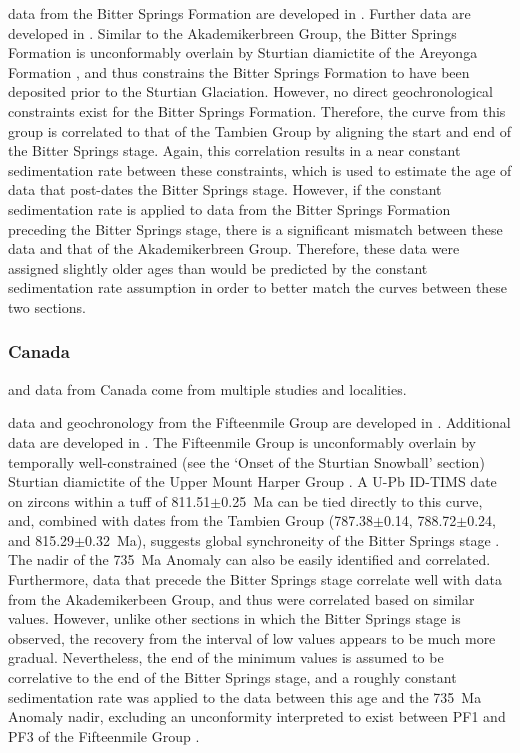 \dC data from the Bitter Springs Formation are developed in \citet{Swanson-Hysell2010a}. Further \SrSr data are developed in \citet{Cox2016a}. Similar to the Akademikerbreen Group, the Bitter Springs Formation is unconformably overlain by Sturtian diamictite of the Areyonga Formation \citep{Swanson-Hysell2010a}, and thus constrains the Bitter Springs Formation to have been deposited prior to the Sturtian Glaciation. However, no direct geochronological constraints exist for the Bitter Springs Formation. Therefore, the \dC curve from this group is correlated to that of the Tambien Group by aligning the start and end of the Bitter Springs stage. Again, this correlation results in a near constant sedimentation rate between these constraints, which is used to estimate the age of data that post-dates the Bitter Springs stage. However, if the constant sedimentation rate is applied to \dC data from the Bitter Springs Formation preceding the Bitter Springs stage, there is a significant mismatch between these data and that of the Akademikerbreen Group. Therefore, these data were assigned slightly older ages than would be predicted by the constant sedimentation rate assumption in order to better match the \dC curves between these two sections.

\subsubsection{Canada}

\dC and \SrSr data from Canada come from multiple studies and localities.

\dC data and geochronology from the Fifteenmile Group are developed in \citet{Macdonald2010a}. Additional \SrSr data are developed in \citet{Cox2016a}. The Fifteenmile Group is unconformably overlain by temporally well-constrained (see the `Onset of the Sturtian Snowball' section) Sturtian diamictite of the Upper Mount Harper Group \citep{Macdonald2010a}. A U-Pb ID-TIMS date on zircons within a tuff of 811.51$\pm$0.25~Ma can be tied directly to this curve, and, combined with dates from the Tambien Group (787.38$\pm$0.14, 788.72$\pm$0.24, and 815.29$\pm$0.32~Ma), suggests global synchroneity of the Bitter Springs stage \citep{Swanson-Hysell2015a}. The nadir of the 735~Ma Anomaly can also be easily identified and correlated. Furthermore, \dC data that precede the Bitter Springs stage correlate well with data from the Akademikerbeen Group, and thus were correlated based on similar \dC values. However, unlike other sections in which the Bitter Springs stage is observed, the recovery from the interval of low \dC values appears to be much more gradual. Nevertheless, the end of the minimum \dC values is assumed to be correlative to the end of the Bitter Springs stage, and a roughly constant sedimentation rate was applied to the data between this age and the 735~Ma Anomaly nadir, excluding an unconformity interpreted to exist between PF1 and PF3 of the Fifteenmile Group \citep{Macdonald2010a}.

